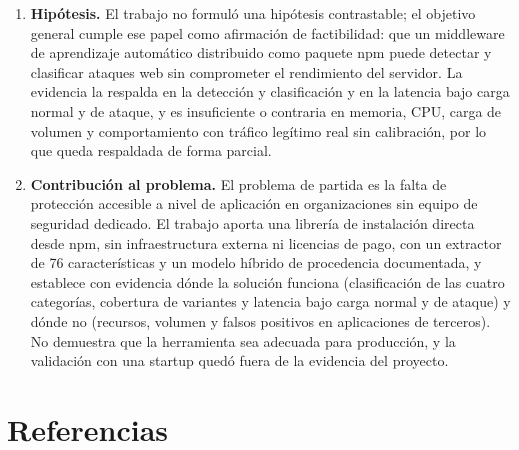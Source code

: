 \begin{enumerate}
    \item \textbf{Hipótesis.} El trabajo no formuló una hipótesis contrastable; el objetivo general
    cumple ese papel como afirmación de factibilidad: que un middleware de aprendizaje automático
    distribuido como paquete npm puede detectar y clasificar ataques web sin comprometer el
    rendimiento del servidor. La evidencia la respalda en la detección y clasificación y en la
    latencia bajo carga normal y de ataque, y es insuficiente o contraria en memoria, CPU, carga de
    volumen y comportamiento con tráfico legítimo real sin calibración, por lo que queda respaldada
    de forma parcial.

    \item \textbf{Contribución al problema.} El problema de partida es la falta de protección
    accesible a nivel de aplicación en organizaciones sin equipo de seguridad dedicado. El trabajo
    aporta una librería de instalación directa desde npm, sin infraestructura externa ni licencias
    de pago, con un extractor de 76 características y un modelo híbrido de procedencia documentada,
    y establece con evidencia dónde la solución funciona (clasificación de las cuatro categorías,
    cobertura de variantes y latencia bajo carga normal y de ataque) y dónde no (recursos, volumen y
    falsos positivos en aplicaciones de terceros). No demuestra que la herramienta sea adecuada para
    producción, y la validación con una startup quedó fuera de la evidencia del proyecto.
\end{enumerate}

\ifdefined\modoensamble
\else
	\section*{Referencias}
	\printbibliography[heading=none]
	
\fi
